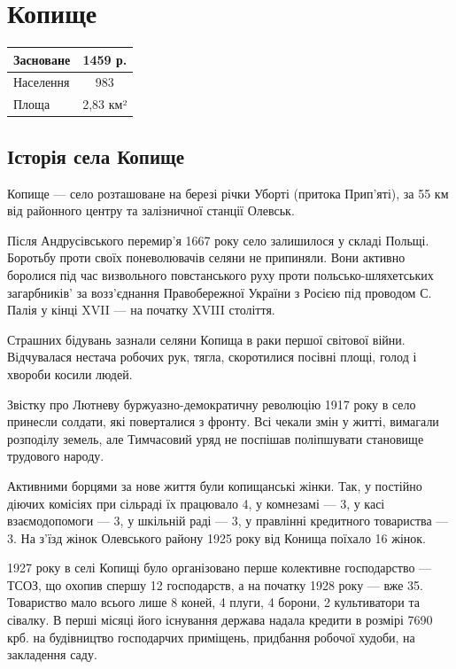 \section {Копище}
\begin{center}
	\begin{tabular}{| l | c |}
		\hline
		Засноване  & 1459 р.\\ 
		\hline
		Населення & 983 \\ 
		\hline 
		Площа & 2,83 км² \\   
		\hline
	\end{tabular}
\end{center}

\subsection{Історія села Копище}

Копище — село розташоване на березі річки Уборті (притока Прип’яті), за 55 км від районного центру та залізничної станції Олевськ.

Після Андрусівського перемир’я 1667 року село залишилося у складі Польщі. Боротьбу проти своїх поневолювачів селяни не припиняли. Вони активно боролися під час визвольного повстанського руху проти польсько-шляхетських загарбників’ за возз’єднання Правобережної України з Росією під проводом С. Палія у кінці XVII — на початку XVIII століття.

Страшних бідувань зазнали селяни Копища в раки першої світової війни. Відчувалася нестача робочих рук, тягла, скоротилися посівні площі, голод і хвороби косили людей.

Звістку про Лютневу буржуазно-демократичну революцію 1917 року в село принесли солдати, які поверталися з фронту. Всі чекали змін у житті, вимагали розподілу земель, але Тимчасовий уряд не поспішав поліпшувати становище трудового народу.

Активними борцями за нове життя були копищанські жінки. Так, у постійно діючих комісіях при сільраді їх працювало 4, у комнезамі — 3, у касі взаємодопомоги — 3, у шкільній раді — 3, у правлінні кредитного товариства — 3. На з’їзд жінок Олевського району 1925 року від Конища поїхало 16 жінок.

1927 року в селі Копищі було організовано перше колективне господарство — ТСОЗ, що охопив спершу 12 господарств, а на початку 1928 року — вже 35. Товариство мало всього лише 8 коней, 4 плуги, 4 борони, 2 культиватори та сівалку. В перші місяці його існування держава надала кредити в розмірі 7690 крб. на будівництво господарчих приміщень, придбання робочої худоби, на закладення саду.

